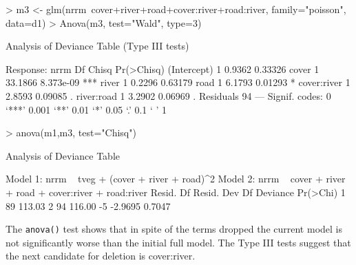 \documentclass{article}
\begin{document}
\begin{Schunk}
\begin{Sinput}
> m3 <- glm(nrrm~cover+river+road+cover:river+road:river, family="poisson", data=d1)
> Anova(m3, test="Wald", type=3)
\end{Sinput}
\begin{Soutput}
Analysis of Deviance Table (Type III tests)

Response: nrrm
            Df   Chisq Pr(>Chisq)    
(Intercept)  1  0.9362    0.33326    
cover        1 33.1866  8.373e-09 ***
river        1  0.2296    0.63179    
road         1  6.1793    0.01293 *  
cover:river  1  2.8593    0.09085 .  
river:road   1  3.2902    0.06969 .  
Residuals   94                       
---
Signif. codes:  0 ‘***’ 0.001 ‘**’ 0.01 ‘*’ 0.05 ‘.’ 0.1 ‘ ’ 1
\end{Soutput}
\begin{Sinput}
> anova(m1,m3, test="Chisq")
\end{Sinput}
\begin{Soutput}
Analysis of Deviance Table

Model 1: nrrm ~ tveg + (cover + river + road)^2
Model 2: nrrm ~ cover + river + road + cover:river + road:river
  Resid. Df Resid. Dev Df Deviance Pr(>Chi)
1        89     113.03                     
2        94     116.00 -5  -2.9695   0.7047
\end{Soutput}
\end{Schunk}

The \verb!anova()! test shows that in spite of the terms dropped the current model is not significantly worse than the initial full model. The Type III tests suggest that the next candidate for deletion is cover:river.
\end{document}
